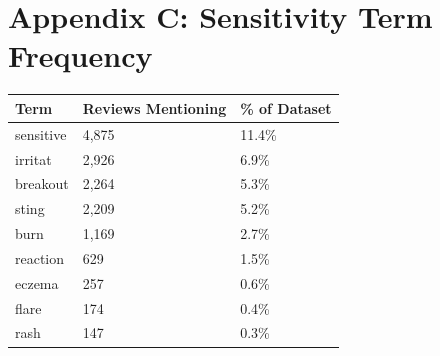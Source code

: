 \documentclass[
  letterpaper,
  DIV=11,
  numbers=noendperiod]{scrartcl}
\newcounter{none} %
\begin{document}
\section{Appendix C: Sensitivity Term
Frequency}\label{appendix-c-sensitivity-term-frequency}

{\def\LTcaptype{none} %
\begin{longtable}[]{@{}lll@{}}
\toprule\noalign{}
Term & Reviews Mentioning & \% of Dataset \\
\midrule\noalign{}
\endhead
\bottomrule\noalign{}
\endlastfoot
sensitive & 4,875 & 11.4\% \\
irritat & 2,926 & 6.9\% \\
breakout & 2,264 & 5.3\% \\
sting & 2,209 & 5.2\% \\
burn & 1,169 & 2.7\% \\
reaction & 629 & 1.5\% \\
eczema & 257 & 0.6\% \\
flare & 174 & 0.4\% \\
rash & 147 & 0.3\% \\
\end{longtable}
}
\end{document}
